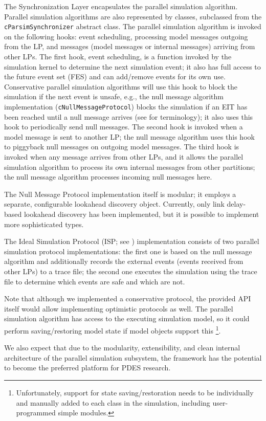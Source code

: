 The Synchronization Layer encapsulates the parallel
simulation algorithm. Parallel simulation algorithms are also represented
by classes, subclassed from the \texttt{cParsimSynchronizer} abstract class.
The parallel simulation algorithm is invoked on the following hooks:
event scheduling, processing model messages outgoing from the LP,
and messages (model messages or internal messages) arriving
from other LPs. The first hook, event scheduling, is a function
invoked by the simulation kernel to determine the next simulation
event; it also has full access to the future event set (FES) and
can add/remove events for its own use.
Conservative parallel simulation algorithms will use this hook
to block the simulation if the next event is unsafe, e.g., the
null message algorithm implementation (\texttt{cNullMessageProtocol})
blocks the simulation if an EIT has been reached until a null message
arrives (see \cite{bagrodia00} for terminology); it also uses
this hook to periodically send null messages. The second hook
is invoked when a model message is sent to another LP;
the null message algorithm uses this hook to piggyback null
messages on outgoing model messages. The third hook is invoked
when any message arrives from other LPs, and it allows the
parallel simulation algorithm to process its own internal messages
from other partitions; the null message algorithm processes
incoming null messages here.

The Null Message Protocol implementation itself is modular;
it employs a separate, configurable lookahead discovery object.
Currently, only link delay-based lookahead discovery has been
implemented, but it is possible to implement more sophisticated
types.

The Ideal Simulation Protocol (ISP; see \cite{bagrodia00})
implementation consists of two parallel simulation
protocol implementations:
the first one is based on the null message algorithm and
additionally records the external events (events received
from other LPs) to a trace file; the second one executes
the simulation using the trace file to determine which
events are safe and which are not.

Note that although we implemented a conservative protocol,
the provided API itself would allow implementing optimistic
protocols as well. The parallel simulation algorithm has
access to the executing simulation model, so it could perform
saving/restoring model state if model objects support this
  \footnote{Unfortunately, support for state saving/restoration
  needs to be individually and manually added to each class
  in the simulation, including user-programmed simple modules.}.

We also expect that due to the modularity, extensibility, and
clean internal architecture of the parallel simulation subsystem,
the {\opp} framework has the potential to become the preferred platform
for PDES research.


